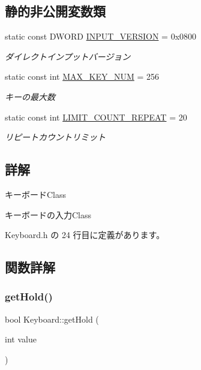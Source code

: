\subsection*{静的非公開変数類}
\begin{DoxyCompactItemize}
\item 
static const D\+W\+O\+RD \mbox{\hyperlink{class_keyboard_a7d90181edbea0aaeb30b734b603f4fe1}{I\+N\+P\+U\+T\+\_\+\+V\+E\+R\+S\+I\+ON}} = 0x0800
\begin{DoxyCompactList}\small\item\em ダイレクトインプットバージョン \end{DoxyCompactList}\item 
static const int \mbox{\hyperlink{class_keyboard_ab151afccd1372a53748e225c7c98e65e}{M\+A\+X\+\_\+\+K\+E\+Y\+\_\+\+N\+UM}} = 256
\begin{DoxyCompactList}\small\item\em キーの最大数 \end{DoxyCompactList}\item 
static const int \mbox{\hyperlink{class_keyboard_a1093ea18b208f9f645eb282acc8b874e}{L\+I\+M\+I\+T\+\_\+\+C\+O\+U\+N\+T\+\_\+\+R\+E\+P\+E\+AT}} = 20
\begin{DoxyCompactList}\small\item\em リピートカウントリミット \end{DoxyCompactList}\end{DoxyCompactItemize}


\subsection{詳解}
キーボード\+Class 

キーボードの入力\+Class 

 Keyboard.\+h の 24 行目に定義があります。



\subsection{関数詳解}
\mbox{\label{class_keyboard_a7dd4b44882383870bb1923065ca0fdfb}} 
\subsubsection{\texorpdfstring{get\+Hold()}{getHold()}}
{\footnotesize\ttfamily bool Keyboard\+::get\+Hold (\begin{DoxyParamCaption}\item[{int}]{value }\end{DoxyParamCaption})}



